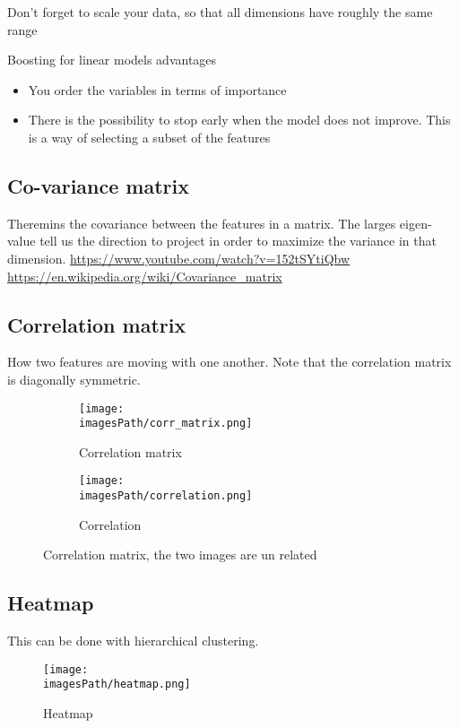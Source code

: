 \documentclass{article}
\newcommand{\imagesPath}{images}
\begin{document}
Don’t forget to scale your data, so that all dimensions have roughly the
same range

Boosting for linear models advantages
\begin{itemize}
    \item You order the variables in terms of importance
    \item There is the possibility to stop early when the model does not
improve. This is a way of selecting a subset of the features
\end{itemize}

\subsection{Co-variance matrix}
Theremins the covariance between the features in a matrix. 
The larges eigen-value tell us the direction to project in order to 
maximize the variance in that dimension.
\url{https://www.youtube.com/watch?v=152tSYtiQbw}
\url{https://en.wikipedia.org/wiki/Covariance_matrix}


\subsection{Correlation matrix}
How two features are moving with one another. Note that the correlation matrix is diagonally symmetric.
\begin{figure}[!h]
     \centering
     \begin{subfigure}[b]{0.35\textwidth}
         \centering
         \texttt{[image: \\imagesPath/corr\_matrix.png]}
         \caption{Correlation matrix}
     \end{subfigure}
     \hfill
     \begin{subfigure}[b]{0.55\textwidth}
         \centering
         \texttt{[image: \\imagesPath/correlation.png]}
         \caption{Correlation}
     \end{subfigure}
    \caption{Correlation matrix, the two images are un related}
\end{figure}


\subsection{Heatmap}
This can be done with hierarchical clustering.
\begin{figure}[!h]
    \centering
    \texttt{[image: \\imagesPath/heatmap.png]}
    \caption{Heatmap}
\end{figure}
\end{document}
